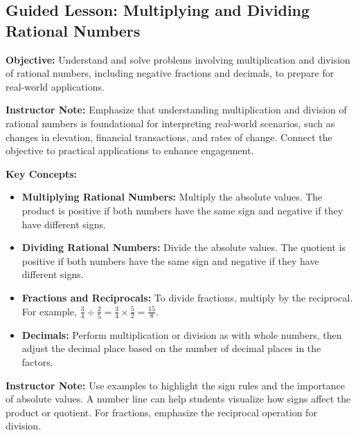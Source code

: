 \documentclass[11pt]{article}
\title{}
\date{}
\begin{document}
\subsection*{Guided Lesson: Multiplying and Dividing Rational Numbers}
\onehalfspacing

\begin{tcolorbox}[colframe=black!40, colback=gray!5, 
coltitle=black, colbacktitle=black!20, fonttitle=\bfseries\Large, 
title=Learning Objective, halign title=center, left=5pt, right=5pt, top=5pt, bottom=15pt]
\textbf{Objective:} Understand and solve problems involving multiplication and division of rational numbers, including negative fractions and decimals, to prepare for real-world applications.

{\color{blue} \textbf{Instructor Note:} Emphasize that understanding multiplication and division of rational numbers is foundational for interpreting real-world scenarios, such as changes in elevation, financial transactions, and rates of change. Connect the objective to practical applications to enhance engagement.}
\end{tcolorbox}

\vspace{1em}

\begin{tcolorbox}[colframe=black!60, colback=white, 
coltitle=black, colbacktitle=black!15, fonttitle=\bfseries\Large, 
title=Key Concepts and Vocabulary, halign title=center, left=10pt, right=10pt, top=10pt, bottom=15pt]
\textbf{Key Concepts:}
\begin{itemize}
    \item \textbf{Multiplying Rational Numbers:} Multiply the absolute values. The product is positive if both numbers have the same sign and negative if they have different signs.
    \item \textbf{Dividing Rational Numbers:} Divide the absolute values. The quotient is positive if both numbers have the same sign and negative if they have different signs.
    \item \textbf{Fractions and Reciprocals:} To divide fractions, multiply by the reciprocal. For example, \( \frac{3}{4} \div \frac{2}{5} = \frac{3}{4} \times \frac{5}{2} = \frac{15}{8} \).
    \item \textbf{Decimals:} Perform multiplication or division as with whole numbers, then adjust the decimal place based on the number of decimal places in the factors.
\end{itemize}

{\color{blue} \textbf{Instructor Note:} Use examples to highlight the sign rules and the importance of absolute values. A number line can help students visualize how signs affect the product or quotient. For fractions, emphasize the reciprocal operation for division.}
\end{tcolorbox}
\end{document}
